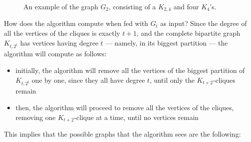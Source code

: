 \documentclass[a4paper, 12pt]{report}
\begin{document}
{\begin{figure}[H]
            \caption{An example of the graph $G_2$, consisting of a $K_{2,4}$ and four $K_4$'s.}
        \end{figure}


        How does the algorithm compute when fed with $G_t$ as input? Since the degree of all the vertices of the cliques is exactly $t + 1$, and the complete bipartite graph $K_{t, 2^t}$ has vertices having degree $t$ --- namely, in its biggest partition --- the algorithm will compute as follows:

        \begin{itemize}
            \item initially, the algorithm will remove all the vertices of the biggest partition of $K_{t, 2^t}$ one by one, since they all have degree $t$, until only the $K_{t + 2}$-cliques remain
            \item then, the algorithm will proceed to remove all the vertices of the cliques, removing one $K_{t + 2}$-clique at a time, until no vertices remain
        \end{itemize}

        This implies that the possible graphs that the algorithm sees are the following:

}
\end{document}
